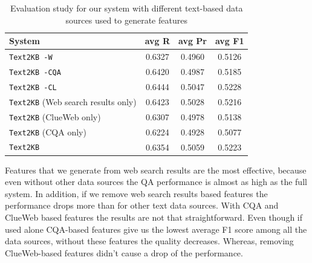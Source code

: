 \begin{table}
\caption{Evaluation study for our system with different text-based data sources used to generate features}
\label{table:ablation:features}
\begin{tabular}{| p{4cm} | c | c | c | }
\hline
System & avg R & avg Pr &  avg F1 \\
\hline
\texttt{Text2KB -W} & 0.6327 & 0.4960 & 0.5126 \\
\texttt{Text2KB -CQA} & 0.6420 & 0.4987 & 0.5185 \\
\texttt{Text2KB -CL} & 0.6444 & 0.5047 & 0.5228 \\
\hline
\texttt{Text2KB} (Web search results only) & 0.6423 & 0.5028 & 0.5216 \\
\texttt{Text2KB} (ClueWeb only) & 0.6307 & 0.4978 & 0.5138 \\
\texttt{Text2KB} (CQA only) & 0.6224 & 0.4928 & 0.5077 \\
\hline
\texttt{Text2KB} & 0.6354 & 0.5059 & 0.5223 \\
\hline
\end{tabular}
\end{table}

Features that we generate from web search results are the most effective, because even without other data sources the QA performance is almost as high as the full system.
In addition, if we remove web search results based features the performance drops more than for other text data sources.
With CQA and ClueWeb based features the results are not that straightforward.
Even though if used alone CQA-based features give us the lowest average F1 score among all the data sources, without these features the quality decreases.
Whereas, removing ClueWeb-based features didn't cause a drop of the performance.

